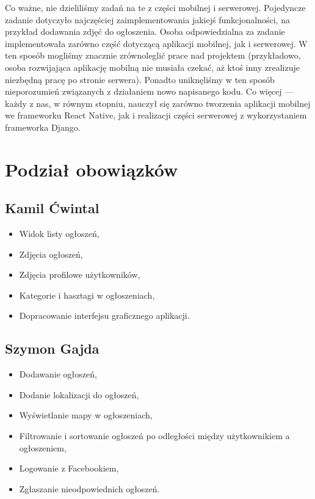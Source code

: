 \documentclass[licencjacka]{pracamgr}
\begin{document}
Co ważne, nie dzieliliśmy zadań na te z części mobilnej i serwerowej. Pojedyncze zadanie dotyczyło najczęściej zaimplementowania jakiejś funkcjonalności, na przykład dodawania zdjęć do ogłoszenia. Osoba odpowiedzialna za zadanie implementowała zarówno część dotyczącą aplikacji mobilnej, jak i serwerowej. W ten sposób mogliśmy znacznie zrównoleglić prace nad projektem (przykładowo, osoba rozwijająca aplikację mobilną nie musiała czekać, aż ktoś inny zrealizuje niezbędną pracę po stronie serwera). Ponadto uniknęliśmy w ten sposób nieporozumień związanych z działaniem nowo napisanego kodu. Co więcej --- każdy z nas, w równym stopniu, nauczył się zarówno tworzenia aplikacji mobilnej we frameworku React Native, jak i realizacji części serwerowej z wykorzystaniem frameworka Django.

\section{Podział obowiązków}

\subsection{Kamil Ćwintal}
\begin{itemize}
\setlength\itemsep{-0.2em}
    \item Widok listy ogłoszeń,
    \item Zdjęcia ogłoszeń,
    \item Zdjęcia profilowe użytkowników,
    \item Kategorie i hasztagi w ogłoszeniach,
    \item Dopracowanie interfejsu graficznego aplikacji.
\end{itemize}{}

\subsection{Szymon Gajda}
\begin{itemize}
\setlength\itemsep{-0.2em}
    \item Dodawanie ogłoszeń,
    \item Dodanie lokalizacji do ogłoszeń,
    \item Wyświetlanie mapy w ogłoszeniach,
    \item Filtrowanie i sortowanie ogłoszeń po odległości między użytkownikiem a ogłoszeniem,
    \item Logowanie z Facebookiem,
    \item Zgłaszanie nieodpowiednich ogłoszeń.
\end{itemize}{}
\end{document}
